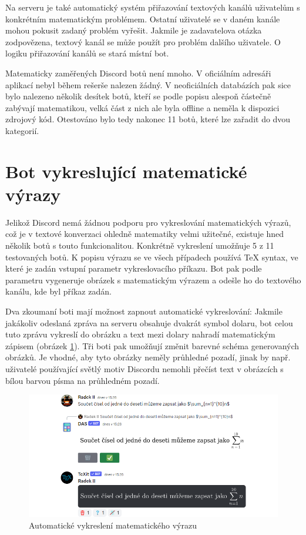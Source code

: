 \documentclass[FM]{tulthesis}
\begin{document}
	Na serveru je také automatický systém přiřazování textových kanálů uživatelům s konkrétním matematickým problémem. Ostatní uživatelé se v daném kanále mohou pokusit zadaný problém vyřešit. Jakmile je zadavatelova otázka zodpovězena, textový kanál se může použít pro problém dalšího uživatele. O logiku přiřazování kanálů se stará místní bot.
	
	Matematicky zaměřených Discord botů není mnoho. V oficiálním adresáři aplikací nebyl během rešerše nalezen žádný. V neoficiálních databázích pak sice bylo nalezeno několik desítek botů, kteří se podle popisu alespoň částečně zabývají matematikou, velká část z nich ale byla offline a neměla k dispozici zdrojový kód. Otestováno bylo tedy nakonec 11 botů, které lze zařadit do dvou kategorií.
	
	\section{Bot vykreslující matematické výrazy}\label{_tag_section_texbot}

	Jelikož Discord nemá žádnou podporu pro vykreslování matematických výrazů, což je v textové konverzaci ohledně matematiky velmi užitečné, existuje hned několik botů s touto funkcionalitou. Konkrétně vykreslení umožňuje 5 z 11 testovaných botů. K popisu výrazu se ve všech případech používá TeX syntax, ve které je zadán vstupní parametr vykreslovacího příkazu. Bot pak podle parametru vygeneruje obrázek s matematickým výrazem a odešle ho do textového kanálu, kde byl příkaz zadán.
	
	Dva zkoumaní boti mají možnost zapnout automatické vykreslování: Jakmile jakákoliv odeslaná zpráva na serveru obsahuje dvakrát symbol dolaru, bot celou tuto zprávu vykreslí do obrázku a text mezi dolary nahradí matematickým zápisem (obrázek \ref{_tag_img_autotex}). Tři boti pak umožňují změnit barevné schéma generovaných obrázků. Je vhodné, aby tyto obrázky neměly průhledné pozadí, jinak by např. uživatelé používající světlý motiv Discordu nemohli přečíst text v obrázcích s bílou barvou písma na průhledném pozadí.
	
	\begin{figure}[ht]
		\centering
		\includegraphics[width=\textwidth]{img/AutoTeX}
		\caption{Automatické vykreslení matematického výrazu}
		\label{_tag_img_autotex}
	\end{figure}
	
\end{document}
